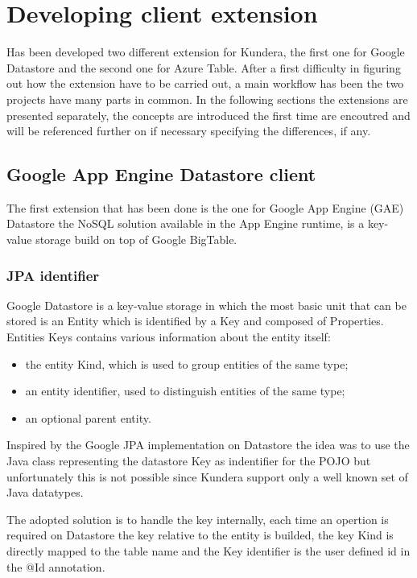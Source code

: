 \section{Developing client extension}
Has been developed two different extension for Kundera, the first one for Google Datastore and the second one for Azure Table.
After a first difficulty in figuring out how the extension have to be carried out, a main workflow has been the two projects have many parts in common. In the following sections the extensions are presented separately, the concepts are introduced the first time are encoutred and will be referenced further on if necessary specifying the differences, if any.

\subsection{Google App Engine Datastore client}
\label{sec:kundera-datastore}
The first extension that has been done is the one for Google App Engine (GAE) Datastore the NoSQL solution available in the App Engine runtime, is a key-value storage build on top of Google BigTable.

\subsubsection{JPA identifier}
Google Datastore is a key-value storage in which the most basic unit that can be stored is an Entity which is identified by a Key and composed of Properties.
Entities Keys contains various information about the entity itself:
\begin{itemize}
\item the entity Kind, which is used to group entities of the same type;
\item an entity identifier, used to distinguish entities of the same type;
\item an optional parent entity. 
\end{itemize}
Inspired by the Google JPA implementation on Datastore the idea was to use the Java class representing the datastore Key as indentifier for the POJO but unfortunately this is not possible since Kundera support only a well known set of Java datatypes.

The adopted solution is to handle the key internally, each time an opertion is required on Datastore the key relative to the entity is builded, the key Kind is directly mapped to the table name and the Key identifier is the user defined id in the @Id annotation.

